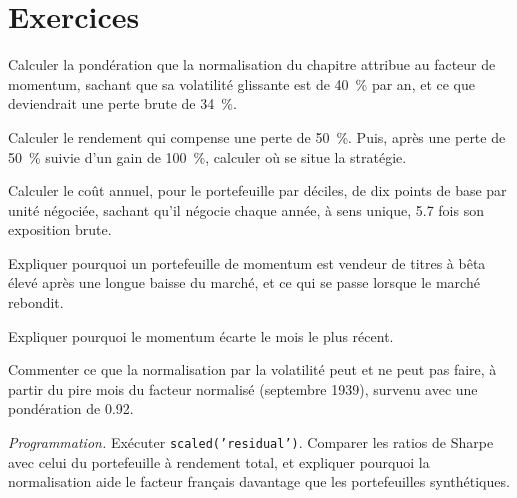 \section{Exercices}

\begin{exercise}[$\star$]\label{exo:s1:momentum:1}
Calculer la pondération que la normalisation du chapitre attribue au facteur de momentum, sachant que sa volatilité glissante est de 40~\% par an, et ce que deviendrait une perte brute de 34~\%.
\end{exercise}

\begin{exercise}[$\star$]\label{exo:s1:momentum:2}
Calculer le rendement qui compense une perte de 50~\%. Puis, après une perte de 50~\% suivie d'un gain de 100~\%, calculer où se situe la stratégie.
\end{exercise}

\begin{exercise}[$\star$]\label{exo:s1:momentum:3}
Calculer le coût annuel, pour le portefeuille par déciles, de dix points de base par unité négociée, sachant qu'il négocie chaque année, à sens unique, 5.7 fois son exposition brute.
\end{exercise}

\begin{exercise}[$\star\star$]\label{exo:s1:momentum:4}
Expliquer pourquoi un portefeuille de momentum est vendeur de titres à bêta élevé après une longue baisse du marché, et ce qui se passe lorsque le marché rebondit.
\end{exercise}

\begin{exercise}[$\star\star$]\label{exo:s1:momentum:5}
Expliquer pourquoi le momentum écarte le mois le plus récent.
\end{exercise}

\begin{exercise}[$\star\star$]\label{exo:s1:momentum:6}
Commenter ce que la normalisation par la volatilité peut et ne peut pas faire, à partir du pire mois du facteur normalisé (septembre 1939), survenu avec une pondération de 0.92.
\end{exercise}

\begin{exercise}[$\star\star\star$]\label{exo:s1:momentum:7}
\emph{Programmation.} Exécuter \texttt{scaled('residual')}. Comparer les ratios de Sharpe avec celui du portefeuille à rendement total, et expliquer pourquoi la normalisation aide le facteur français
davantage que les portefeuilles synthétiques.
\end{exercise}

